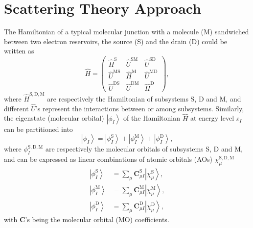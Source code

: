 \documentclass[a4paper,11pt,twoside,openright]{book}
\begin{document}
\section{Scattering Theory Approach}
\label{section-scattering-theory}

The Hamiltonian of a typical molecular junction with a molecule (M) sandwiched between
two electron reservoirs, the source (S) and the drain (D) could be written as\cite{Jiang-JCP124-034708}
\begin{equation}
  \label{eq-unperturbed-Hamiltonian}
  \hat{H}=\begin{pmatrix}
    \hat{H}^{\text{S}} & \hat{U}^{\text{SM}} & \hat{U}^{\text{SD}}\\
    \hat{U}^{\text{MS}} & \hat{H}^{\text{M}} & \hat{U}^{\text{MD}}\\
    \hat{U}^{\text{DS}} & \hat{U}^{\text{DM}} & \hat{H}^{\text{D}}
  \end{pmatrix},
\end{equation}
where $\hat{H}^{\text{S},\text{D},\text{M}}$ are respectively the Hamiltonian of subsystems S, D and M,
and different $\hat{U}$'s represent the interactions between or among subsystems. Similarly, the
eigenstate (molecular orbital) $\left|\phi_{I}\right\rangle$ of the Hamiltonian $\hat{H}$ at energy
level $\varepsilon_{I}$ can be partitioned into
\begin{equation}
  \label{eq-partition-MO}
  \left|\phi_{I}\right\rangle
  =\left|\phi_{I}^{\text{S}}\right\rangle+\left|\phi_{I}^{\text{M}}\right\rangle+\left|\phi_{I}^{\text{D}}\right\rangle,
\end{equation}
where $\phi_{I}^{\text{S},\text{D},\text{M}}$ are respectively the molecular orbitals of subsystems
S, D and M, and can be expressed as linear combinations of atomic orbitals (AOs) $\chi_{\mu}^{\text{S},\text{D},\text{M}}$
\begin{align}
  \left|\phi_{I}^{\text{S}}\right\rangle
  &=\sum_{\mu}\mathbf{C}_{\mu I}^{\text{S}}\left|\chi_{\mu}^{\text{S}}\right\rangle,\\
  \left|\phi_{I}^{\text{M}}\right\rangle
  &=\sum_{\mu}\mathbf{C}_{\mu I}^{\text{M}}\left|\chi_{\mu}^{\text{M}}\right\rangle,\\
  \left|\phi_{I}^{\text{D}}\right\rangle
  &=\sum_{\mu}\mathbf{C}_{\mu I}^{\text{D}}\left|\chi_{\mu}^{\text{D}}\right\rangle,
\end{align}
with $\mathbf{C}$'s being the molecular orbital (MO) coefficients.
\end{document}
